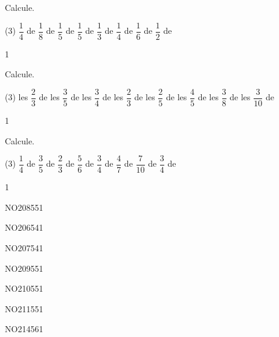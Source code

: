 \documentclass[a4paper,11pt]{report}
\begin{document}
\begin{exo}{
Calcule.
\begin{tasks}(3)
	\task $\dfrac{1}{4}$ de 
	\task $\dfrac{1}{8}$ de 
	\task $\dfrac{1}{5}$ de 
	\task $\dfrac{1}{5}$ de 
	\task $\dfrac{1}{3}$ de 
	\task $\dfrac{1}{4}$ de 
	\task $\dfrac{1}{6}$ de 
	\task $\dfrac{1}{2}$ de 
\end{tasks}
 \vspace{1pt}
}{1}\end{exo}

\begin{exo}{
Calcule.
\begin{tasks}(3)
	\task les $\dfrac{2}{3}$ de 
	\task les $\dfrac{3}{5}$ de 
	\task les $\dfrac{3}{4}$ de 
	\task les $\dfrac{2}{3}$ de 
	\task les $\dfrac{2}{5}$ de 
	\task les $\dfrac{4}{5}$ de 
	\task les $\dfrac{3}{8}$ de 
	\task les $\dfrac{3}{10}$ de 
\end{tasks}
 \vspace{1pt}
}{1}\end{exo}

\begin{exo}{
Calcule.
\begin{tasks}(3)
	\task $\dfrac{1}{4}$ de 
	\task $\dfrac{3}{5}$ de 
	\task $\dfrac{2}{3}$ de 
	\task $\dfrac{5}{6}$ de 
	\task $\dfrac{3}{4}$ de 
	\task $\dfrac{4}{7}$ de 
	\task $\dfrac{7}{10}$ de 
	\task $\dfrac{3}{4}$ de 
\end{tasks}
 \vspace{1pt}
}{1}\end{exo}

\begin{exol}{NO208}{55}{1}
\end{exol}
\begin{exol}{NO206}{54}{1}
\end{exol}
\begin{exol}{NO207}{54}{1}
\end{exol}
\begin{exol}{NO209}{55}{1}
\end{exol}
\begin{exol}{NO210}{55}{1}
\end{exol}
\begin{exol}{NO211}{55}{1}
\end{exol}
\begin{exol}{NO214}{56}{1}
\end{exol}
\end{document}
